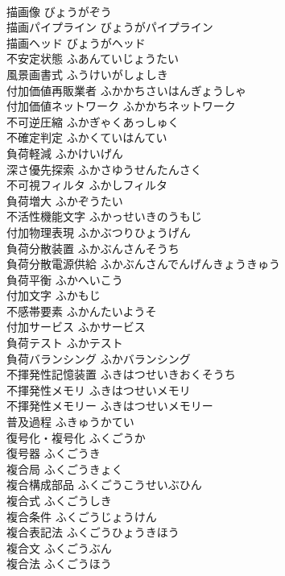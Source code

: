 \documentclass[8pt]{extreport}
\begin{document}
\begin{CJK}{UTF8}{min}
\\	描画像	びょうがぞう	
\\	描画パイプライン	びょうがパイプライン	
\\	描画ヘッド	びょうがヘッド	
\\	不安定状態	ふあんていじょうたい	
\\	風景画書式	ふうけいがしょしき	
\\	付加価値再販業者	ふかかちさいはんぎょうしゃ	
\\	付加価値ネットワーク	ふかかちネットワーク	
\\	不可逆圧縮	ふかぎゃくあっしゅく	
\\	不確定判定	ふかくていはんてい	
\\	負荷軽減	ふかけいげん	
\\	深さ優先探索	ふかさゆうせんたんさく	
\\	不可視フィルタ	ふかしフィルタ	
\\	負荷増大	ふかぞうたい	
\\	不活性機能文字	ふかっせいきのうもじ	
\\	付加物理表現	ふかぶつりひょうげん	
\\	負荷分散装置	ふかぶんさんそうち	
\\	負荷分散電源供給	ふかぶんさんでんげんきょうきゅう	
\\	負荷平衡	ふかへいこう	
\\	付加文字	ふかもじ	
\\	不感帯要素	ふかんたいようそ	
\\	付加サービス	ふかサービス	
\\	負荷テスト	ふかテスト	
\\	負荷バランシング	ふかバランシング	
\\	不揮発性記憶装置	ふきはつせいきおくそうち	
\\	不揮発性メモリ	ふきはつせいメモリ	
\\	不揮発性メモリー	ふきはつせいメモリー	
\\	普及過程	ふきゅうかてい	
\\	復号化・複号化	ふくごうか	
\\	復号器	ふくごうき	
\\	複合局	ふくごうきょく	
\\	複合構成部品	ふくごうこうせいぶひん	
\\	複合式	ふくごうしき	
\\	複合条件	ふくごうじょうけん	
\\	複合表記法	ふくごうひょうきほう	
\\	複合文	ふくごうぶん	
\\	複合法	ふくごうほう	

\end{CJK}
\end{document}
